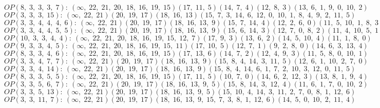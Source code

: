 $OP(8, \;3, \;3, \;3, \;7): \:(\infty, \;22, \;21, \;20, \;18, \;16, \;19, \;15)(17, \;11, \;5)(14, \;7, \;4)(12, \;8, \;3)(13, \;6, \;1, \;9, \;0, \;10, \;2)$\\
$OP(3, \;3, \;3, \;15): \:(\infty, \;22, \;21)(20, \;19, \;17)(18, \;16, \;13)(15, \;7, \;3, \;14, \;6, \;12, \;0, \;10, \;1, \;8, \;4, \;9, \;2, \;11, \;5)$\\
$OP(3, \;3, \;4, \;4, \;4, \;6): \:(\infty, \;22, \;21)(20, \;19, \;17)(18, \;16, \;13, \;9)(15, \;7, \;14, \;4)(12, \;2, \;6, \;0)(11, \;5, \;10, \;1, \;8, \;3)$\\
$OP(3, \;3, \;4, \;4, \;5, \;5): \:(\infty, \;22, \;21)(20, \;19, \;17)(18, \;16, \;13, \;9)(15, \;6, \;14, \;3)(12, \;7, \;0, \;8, \;2)(11, \;4, \;10, \;5, \;1)$\\
$OP(10, \;3, \;3, \;4, \;4): \:(\infty, \;22, \;21, \;20, \;18, \;16, \;19, \;15, \;12, \;7)(17, \;9, \;3)(13, \;6, \;2)(14, \;5, \;10, \;4)(11, \;1, \;8, \;0)$\\
$OP(9, \;3, \;3, \;4, \;5): \:(\infty, \;22, \;21, \;20, \;18, \;16, \;19, \;15, \;11)(17, \;10, \;5)(12, \;7, \;1)(9, \;2, \;8, \;0)(14, \;6, \;3, \;13, \;4)$\\
$OP(8, \;3, \;3, \;4, \;6): \:(\infty, \;22, \;21, \;20, \;18, \;16, \;19, \;15)(17, \;13, \;6)(14, \;7, \;2)(12, \;4, \;9, \;3)(11, \;5, \;8, \;0, \;10, \;1)$\\
$OP(3, \;3, \;4, \;7, \;7): \:(\infty, \;22, \;21)(20, \;19, \;17)(18, \;16, \;13, \;9)(15, \;8, \;4, \;14, \;3, \;11, \;5)(12, \;6, \;1, \;10, \;2, \;7, \;0)$\\
$OP(3, \;3, \;4, \;14): \:(\infty, \;22, \;21)(20, \;19, \;17)(18, \;16, \;13, \;9)(15, \;8, \;4, \;14, \;6, \;1, \;7, \;2, \;10, \;3, \;12, \;0, \;11, \;5)$\\
$OP(8, \;3, \;3, \;5, \;5): \:(\infty, \;22, \;21, \;20, \;18, \;16, \;19, \;15)(17, \;11, \;5)(10, \;7, \;0)(14, \;6, \;2, \;12, \;3)(13, \;8, \;1, \;9, \;4)$\\
$OP(3, \;3, \;5, \;6, \;7): \:(\infty, \;22, \;21)(20, \;19, \;17)(18, \;16, \;13, \;9, \;5)(15, \;8, \;14, \;3, \;12, \;4)(11, \;6, \;1, \;7, \;0, \;10, \;2)$\\
$OP(3, \;3, \;5, \;13): \:(\infty, \;22, \;21)(20, \;19, \;17)(18, \;16, \;13, \;9, \;5)(15, \;10, \;4, \;14, \;3, \;11, \;2, \;7, \;0, \;8, \;1, \;12, \;6)$\\
$OP(3, \;3, \;11, \;7): \:(\infty, \;22, \;21)(20, \;19, \;17)(18, \;16, \;13, \;9, \;15, \;7, \;3, \;8, \;1, \;12, \;6)(14, \;5, \;0, \;10, \;2, \;11, \;4)$\\
